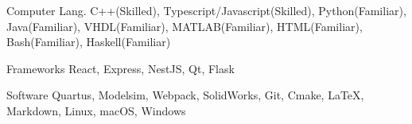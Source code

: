 

\begin{cvskills}

  \cvskill
    {Computer Lang.} %
    {C++(Skilled), Typescript/Javascript(Skilled), Python(Familiar), Java(Familiar), VHDL(Familiar), MATLAB(Familiar), HTML(Familiar), Bash(Familiar), Haskell(Familiar)} %

  \cvskill
    {Frameworks\phantom{aaa}} %
    {React, Express, NestJS, Qt, Flask} %

  \cvskill
    {Software\phantom{aaaaaa}} %
    {Quartus, Modelsim, Webpack, SolidWorks, Git, Cmake, LaTeX, Markdown, Linux, macOS, Windows} %


\end{cvskills}

